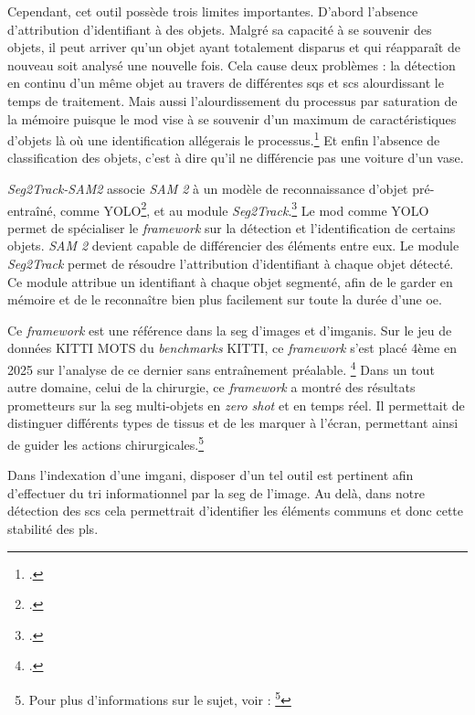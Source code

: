 Cependant, cet outil possède trois limites importantes. D'abord l'absence d'attribution d'identifiant à des objets. Malgré sa capacité à se souvenir des objets, il peut arriver qu'un objet ayant totalement disparus et qui réapparaît de nouveau soit analysé une nouvelle fois. Cela cause deux problèmes : la détection en continu d'un même objet au travers de différentes \glspl{sq} et \glspl{sc} alourdissant le temps de traitement. Mais aussi l'alourdissement du processus par saturation de la mémoire puisque le \gls{mod} vise à se souvenir d'un maximum de caractéristiques d'objets là où une identification allégerais le processus.\footcite[p.22 à 40]{raviSAM2SEGMENT2025} Et enfin l'absence de classification des objets, c'est à dire qu'il ne différencie pas une voiture d'un vase.\newline

\textit{Seg2Track-SAM2} associe \textit{SAM 2} à un modèle de reconnaissance d'objet pré-entraîné, comme YOLO\footcite{ultralyticsQuestCeQuun2026}, et au module \textit{Seg2Track}.\footcite{mendoncaSeg2TrackSAM2SAM2basedMultiobject2025a} Le \gls{mod} comme YOLO permet de spécialiser le \textit{framework} sur la détection et l'identification de certains objets. \textit{SAM 2} devient capable de différencier des éléments entre eux. Le module \textit{Seg2Track} permet de résoudre l'attribution d'identifiant à chaque objet détecté. Ce module attribue un identifiant à chaque objet segmenté, afin de le garder en mémoire et de le reconnaître bien plus facilement sur toute la durée d'une \gls{oe}.

Ce \textit{framework} est une référence dans la \gls{seg} d'images et d'\glspl{imgani}. Sur le jeu de données KITTI MOTS du \textit{benchmarks} KITTI, ce \textit{framework} s'est placé 4ème en 2025 sur l'analyse de ce dernier sans entraînement préalable. \footcite[p.5]{mendoncaSeg2TrackSAM2SAM2basedMultiobject2025a} Dans un tout autre domaine, celui de la chirurgie, ce \textit{framework} a montré des résultats prometteurs sur la \gls{seg} multi-objets en \textit{zero shot} et en temps réel. Il permettait de distinguer différents types de tissus et de les marquer à l'écran, permettant ainsi de guider les actions chirurgicales.\footnote{Pour plus d'informations sur le sujet, voir : \footcite{yuanSystematicEvaluationGuidelines2026}} \newline

Dans l'indexation d'une \gls{imgani}, disposer d'un tel outil est pertinent afin d'effectuer du tri informationnel par la \gls{seg} de l'image. Au delà, dans notre détection des \glspl{sc} cela permettrait d'identifier les éléments communs et donc cette stabilité des \glspl{pl}.

